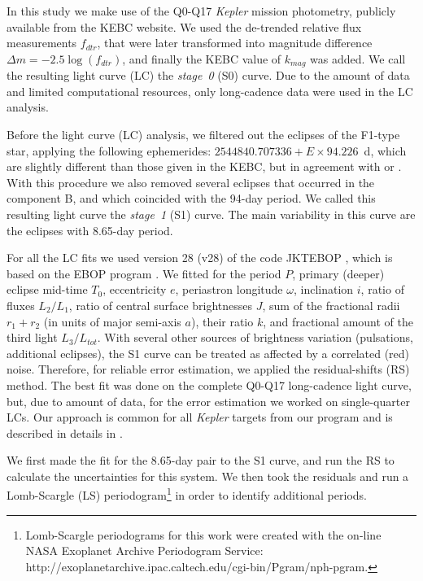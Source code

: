 \documentclass{aa}
\newcommand{\kep}{{\it Kepler }}
\begin{document}
In this study we make use of the Q0-Q17 \kep mission photometry, publicly 
available from the KEBC website. We used the de-trended relative flux measurements $f_{dtr}$, 
that were later transformed into magnitude difference $\Delta m=-2.5\log(f_{dtr})$,
and finally the KEBC value of $k_{mag}$ was added. We call the resulting light
curve (LC) the {\it stage~0} (S0) curve. Due to the amount of data and limited computational 
resources, only long-cadence data were used in the LC analysis.

Before the light curve (LC) analysis, we filtered out the eclipses of the F1-type star, 
applying the following ephemerides: $2544840.707336 + E\times 94.226$~d, which are 
slightly different than those given in the KEBC, but in agreement with \citet{bal14}
or \citet{row15}. With this procedure we also removed several eclipses that 
occurred in the component B, and which coincided with the 94-day period. 
We called this resulting light curve the {\it stage~1} (S1) curve. The main
variability in this curve are the eclipses with 8.65-day period.

For all the LC fits we used version 28 (v28) of the code JKTEBOP 
\citep{sou04a,sou04b}, which is based on the EBOP program \citep{pop81}. 
We fitted for the period $P$, primary (deeper) eclipse mid-time $T_0$, 
eccentricity $e$, periastron longitude $\omega$, inclination $i$, 
ratio of fluxes $L_2/L_1$, ratio of central surface brightnesses $J$, 
sum of the fractional radii $r_1+r_2$ (in units of major semi-axis $a$), 
their ratio $k$, and fractional amount of the third light $L_3/L_{tot}$.
With several other sources of brightness variation (pulsations, additional 
eclipses), the S1 curve can be treated as affected by a correlated (red) noise.
Therefore, for reliable error estimation, we applied the residual-shifts (RS) 
method. The best fit was done on the complete Q0-Q17 long-cadence light curve, 
but, due to amount of data, for the error estimation we worked on single-quarter LCs.
Our approach is common for all \kep targets from our program and is described in 
details in \citet{hel16}.

We first made the fit for the 8.65-day pair to the S1 curve, and run the RS to 
calculate the uncertainties for this system. We then took the residuals and run 
a Lomb-Scargle (LS) periodogram\footnote{Lomb-Scargle periodograms for this work were 
created with the on-line NASA Exoplanet Archive Periodogram Service:\\ 
http://exoplanetarchive.ipac.caltech.edu/cgi-bin/Pgram/nph-pgram.}  
in order to identify additional periods. 
\end{document}
